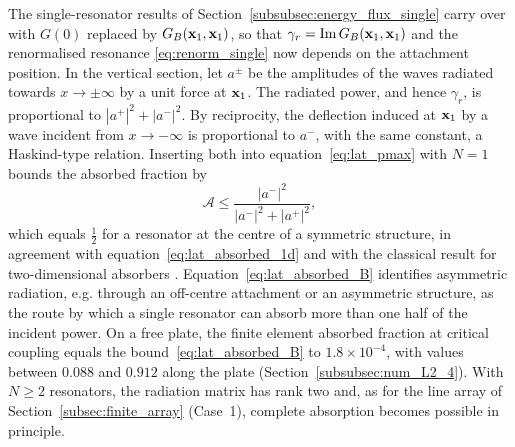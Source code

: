 The single-resonator results of Section~\ref{subsubsec:energy_flux_single} carry over with $G(0)$ replaced by $G_B(\mathbf{x}_1,\mathbf{x}_1)$, so that $\gamma_r=\operatorname{Im}G_B(\mathbf{x}_1,\mathbf{x}_1)$ and the renormalised resonance \eqref{eq:renorm_single} now depends on the attachment position. In the vertical section, let $a^\pm$ be the amplitudes of the waves radiated towards $x\to\pm\infty$ by a unit force at $\mathbf{x}_1$. The radiated power, and hence $\gamma_r$, is proportional to $|a^+|^2+|a^-|^2$. By reciprocity, the deflection induced at $\mathbf{x}_1$ by a wave incident from $x\to-\infty$ is proportional to $a^-$, with the same constant, a Haskind-type relation. Inserting both into equation~\eqref{eq:lat_pmax} with $N=1$ bounds the absorbed fraction by
\begin{equation}\label{eq:lat_absorbed_B}
    \mathcal{A}\le\frac{|a^-|^2}{|a^-|^2+|a^+|^2},
\end{equation}
which equals $\tfrac12$ for a resonator at the centre of a symmetric structure, in agreement with equation~\eqref{eq:lat_absorbed_1d} and with the classical result for two-dimensional absorbers \citep{evans1976theory}. Equation~\eqref{eq:lat_absorbed_B} identifies asymmetric radiation, e.g. through an off-centre attachment or an asymmetric structure, as the route by which a single resonator can absorb more than one half of the incident power. {\color{red}On a free plate, the finite element absorbed fraction at critical coupling equals the bound~\eqref{eq:lat_absorbed_B} to $1.8\times10^{-4}$, with values between $0.088$ and $0.912$ along the plate (Section~\ref{subsubsec:num_L2_4}).} With $N\ge2$ resonators, the radiation matrix has rank two and, as for the line array of Section~\ref{subsec:finite_array} (Case~1), complete absorption becomes possible in principle.